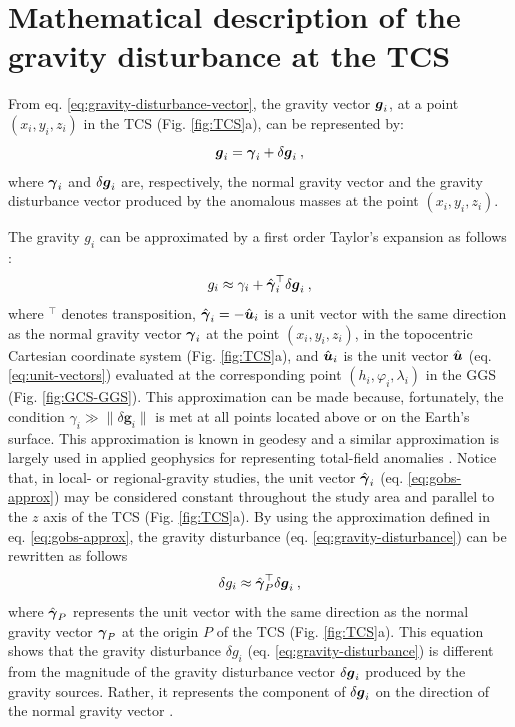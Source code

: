 \documentclass[extra]{gji}
\begin{document}
\section{Mathematical description of the gravity disturbance at the TCS}

From eq. \ref{eq:gravity-disturbance-vector}, the gravity vector $\mitbf{g}_{i}$, at a point
$(x_{i}, y_{i}, z_{i})$ in the TCS (Fig. \ref{fig:TCS}a), can be represented by:
\begin{equation}
\mitbf{g}_{i} = \mitbf{\gamma}_{i} + \delta \mitbf{g}_{i} \: ,
\label{eq:gravity-vector-TCS}
\end{equation}
where $\mitbf{\gamma}_{i}$ and $\delta \mitbf{g}_{i}$
are, respectively, the normal gravity vector and the
gravity disturbance vector produced by the anomalous
masses at the point $(x_{i}, y_{i}, z_{i})$.

The gravity $g_{i}$ can be approximated by a first order Taylor's
expansion as follows \citep{sanso_sideris2013}:
\begin{equation}
g_{i} \approx \gamma_{i} +
\hat{\mitbf{\gamma}}_{i}^{\top} \delta \mitbf{g}_{i} \: ,
\label{eq:gobs-approx}
\end{equation}
where $^{\top}$ denotes transposition,
$\hat{\mitbf{\gamma}}_{i} = -\hat{\mitbf{u}}_{i}$ is a unit
vector with the same direction as the normal gravity vector
$\mitbf{\gamma}_{i}$ at the point $(x_{i}, y_{i}, z_{i})$, in the
topocentric Cartesian coordinate system (Fig. \ref{fig:TCS}a), and
$\hat{\mitbf{u}}_{i}$ is the unit vector $\hat{\mitbf{u}}$
(eq. \ref{eq:unit-vectors}) evaluated at the corresponding
point $(h_{i}, \varphi_{i}, \lambda_{i})$ in the
GGS (Fig. \ref{fig:GCS-GGS}).
This approximation can be made because, fortunately,
the condition $\gamma_{i} \gg \| \delta \mathbf{g}_{i} \|$
is met at all points located above or on the Earth's surface.
This approximation is known in geodesy \citep[e.g.,][]{sanso_sideris2013}
and a similar approximation is largely used in applied geophysics
for representing total-field anomalies \citep[e.g.,][]{blakely1996}.
Notice that, in local- or regional-gravity studies, the unit
vector $\hat{\mitbf{\gamma}}_{i}$ (eq. \ref{eq:gobs-approx})
may be considered constant throughout the study area and
parallel to the $z$ axis of the TCS (Fig. \ref{fig:TCS}a).
By using the approximation defined in eq.
\ref{eq:gobs-approx}, the gravity disturbance
(eq. \ref{eq:gravity-disturbance}) can be rewritten as
follows
\begin{equation}
\delta g_{i} \approx \hat{\mitbf{\gamma}}_{P}^{\top} \delta \mitbf{g}_{i} \: ,
\label{eq:gravity-disturbance-approx-TCS}
\end{equation}
where $\hat{\mitbf{\gamma}}_{P}$ represents the unit vector with
the same direction as the normal gravity vector $\mitbf{\gamma}_{P}$
at the origin $P$ of the TCS (Fig. \ref{fig:TCS}a).
This equation shows that the gravity disturbance $\delta g_{i}$ (eq. \ref{eq:gravity-disturbance}) is different from the magnitude
of the gravity disturbance vector $\delta \mitbf{g}_{i}$
produced by the gravity sources. Rather, it represents the
component of $\delta \mitbf{g}_{i}$ on the direction of the normal
gravity vector \citep{hofmann-wellenhof-moritz2005, sanso_sideris2013}.
\end{document}
